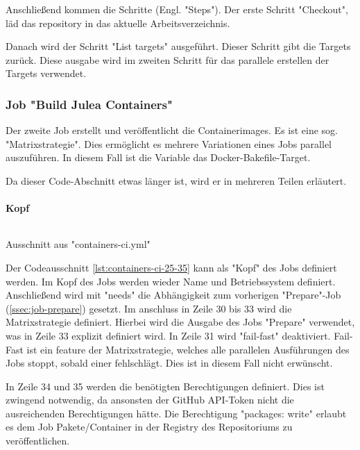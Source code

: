 Anschließend kommen die Schritte (Engl. "Steps"). Der erste Schritt "Checkout", läd das repository in das aktuelle Arbeitsverzeichnis.

Danach wird der Schritt "List targets" ausgeführt. Dieser Schritt gibt die Targets zurück. Diese ausgabe wird im zweiten Schritt für das parallele erstellen der Targets verwendet.

\subsubsection{Job "Build Julea Containers"}

Der zweite Job erstellt und veröffentlicht die Containerimages. Es ist eine sog. "Matrixstrategie". Dies ermöglicht es mehrere Variationen eines Jobs parallel auszuführen. In diesem Fall ist die Variable das Docker-Bakefile-Target. 

Da dieser Code-Abschnitt etwas länger ist, wird er in mehreren Teilen erläutert.

\paragraph{Kopf}

\begin{listing}[H]
    \inputminted[firstline=25,lastline=35]{yaml}{./code-examples/containers-ci.yml}
    \caption{Ausschnitt aus "containers-ci.yml"}
    \label{lst:containers-ci-25-35}
\end{listing}

Der Codeausschnitt \cref{lst:containers-ci-25-35} kann als "Kopf" des Jobs definiert werden. Im Kopf des Jobs werden wieder Name und Betriebssystem definiert. Anschließend wird mit "needs" die Abhängigkeit zum vorherigen "Prepare"-Job (\cref{ssec:job-prepare}) gesetzt. Im anschluss in Zeile 30 bis 33 wird die Matrixstrategie definiert. Hierbei wird die Ausgabe des Jobs "Prepare" verwendet, was in Zeile 33 explizit definiert wird. In Zeile 31 wird "fail-fast" deaktiviert. Fail-Fast ist ein feature der Matrixstrategie, welches alle parallelen Ausführungen des Jobs stoppt, sobald einer fehlschlägt. Dies ist in diesem Fall nicht erwünscht.

In Zeile 34 und 35 werden die benötigten Berechtigungen definiert. Dies ist zwingend notwendig, da ansonsten der GitHub API-Token nicht die ausreichenden Berechtigungen hätte. Die Berechtigung "packages: write" erlaubt es dem Job Pakete/Container in der Registry des Repositoriums zu veröffentlichen.


